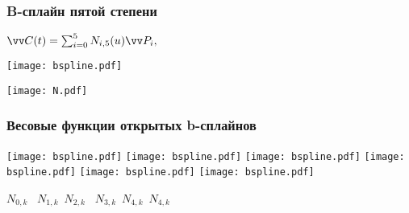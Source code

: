 \documentclass[10pt]{beamer}
\begin{document}
   \begin{frame}\frametitle{B-сплайн пятой степени}
 	
 	{
 	}{
 		
 		$\vv C(t) = \sum_{i=0}^{5}N_{i,5}(u)\vv P_i,$
 		
 		\texttt{[image: bspline.pdf]}
 		
 		\texttt{[image: N.pdf]}
 		
 	}
 	
 \end{frame}
 
 
 \begin{frame}[squeeze]\frametitle{Весовые функции открытых b-сплайнов}
 	
 	\edef\s{0.85}
	\centering
			\texttt{[image: bspline.pdf]}
			\texttt{[image: bspline.pdf]}
			\texttt{[image: bspline.pdf]}
			\texttt{[image: bspline.pdf]}
			\texttt{[image: bspline.pdf]}
			\texttt{[image: bspline.pdf]}

	 {\color{red}$N_{0,k}$} \		 
	{\color{ForestGreen}$N_{1,k}$}\ 		
	{\color{blue}$N_{2,k}$} \		
	{\color{Orange}$N_{3,k}$}\ 		
	{\color{Magenta}$N_{4,k}$}\ 		
	{\color{DeepSkyBlue}$N_{4,k}$}
 
 	\TC{0.5}
 	{
% 		
% 		
% 		
% 		
 	}{

 	}
 	

 	
 \end{frame}
 

 
\end{document}
